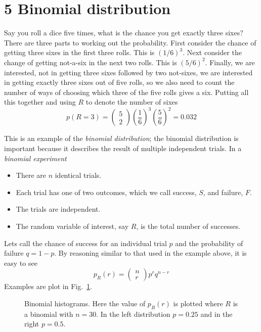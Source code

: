 \documentclass[11pt,a4paper]{scrartcl}
\begin{document}
\section*{5 Binomial distribution}

Say you roll a dice five times, what is the chance you get exactly
three sixes? There are three parts to working out the
probability. First consider the chance of getting three sixes in the
first three rolls. This is $(1/6)^3$. Next consider the change of
getting not-a-six in the next two rolls. This is $(5/6)^2$. Finally,
we are interested, not in getting three sixes followed by two
not-sixes, we are interested in getting exactly three sixes out of
five rolls, so we also need to count the number of ways of choosing
which three of the five rolls gives a six. Putting all this together
and using $R$ to denote the number of sixes
\begin{equation}
p(R=3)=\left(\begin{array}{c}5\\2\end{array}\right)\left(\frac{1}{6}\right)^3\left(\frac{5}{6}\right)^2=0.032
\end{equation}

This is an example of the \textsl{binomial distribution}; the binomial
distribution is important because it describes the result of multiple
independent trials. In a \textsl{binomial experiment}  
\begin{itemize}
\item There are $n$ identical trials.
\item Each trial has one of two outcomes, which we call success, $S$,
  and failure, $F$.
\item The trials are independent.
\item The random variable of interest, say $R$, is the total number of successes.
\end{itemize}
Lets call the chance of success for an individual trial $p$ and the
probability of failure $q=1-p$. By reasoning similar to that used in
the example above, it is easy to see
\begin{equation}
p_R(r)=\left(\begin{array}{c}n\\r\end{array}\right)p^rq^{n-r}
\end{equation}
Examples are plot in Fig.~\ref{fig_binomial}.

\begin{figure}[htb]
\begin{center}

\end{center}
\caption{Binomial histograms. Here the value of $p_R(r)$ is plotted where $R$ is a binomial with $n=30$. In the left distribution $p=0.25$ and in the right $p=0.5$.\label{fig_binomial}}
\end{figure}
\end{document}
